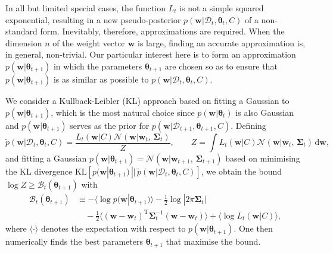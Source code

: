 In all but limited special cases, the function $L_t$ is not a simple squared exponential, resulting in a new pseudo-posterior $p(\mathbf{w}|\mathcal{D}_t, \boldsymbol{\theta}_t, C)$ of a non-standard form. Inevitably, therefore, approximations are required. When the dimension $n$ of the weight vector $\mathbf{w}$ is large, finding an accurate approximation is, in general, non-trivial. Our particular interest here is to form an approximation $p(\mathbf{w}|\boldsymbol{\theta}_{t+1})$ in which the parameters $\boldsymbol{\theta}_{t+1}$ are chosen so as to ensure that $p(\mathbf{w}|\boldsymbol{\theta}_{t+1})$ is as similar as possible to $p(\mathbf{w}|\mathcal{D}_t, \boldsymbol{\theta}_t, C)$.

We consider a Kullback-Leibler (KL) approach based on fitting a Gaussian to $p(\mathbf{w}|\boldsymbol{\theta}_{t+1})$, which is the most natural choice since $p(\mathbf{w}|\boldsymbol{\theta}_t)$ is also Gaussian and $p(\mathbf{w}|\boldsymbol{\theta}_{t+1})$ serves as the prior for $p(\mathbf{w}|\mathcal{D}_{t+1}, \boldsymbol{\theta}_{t+1}, C)$. Defining
\begin{equation}
	\widetilde{p}(\mathbf{w}|\mathcal{D}_t, \boldsymbol{\theta}_t, C)
	= \frac{L_t(\mathbf{w}|C)\mathcal{N}(\mathbf{w}|\mathbf{w}_t,\, \boldsymbol{\Sigma}_{t})}{Z},
	\qquad Z = \int L_t(\mathbf{w}|C)\mathcal{N}(\mathbf{w}|\mathbf{w}_t,\, \boldsymbol{\Sigma}_{t}) \, \mathrm{d}\mathbf{w},
\end{equation}
and fitting a Gaussian $p(\mathbf{w}|\boldsymbol{\theta}_{t+1}) = \mathcal{N}(\mathbf{w}|\mathbf{w}_{t+1},\, \boldsymbol{\Sigma}_{t+1})$ based on minimising the KL divergence $\mathrm{KL}[p(\mathbf{w}|\boldsymbol{\theta}_{t+1}) \, || \, \widetilde{p}(\mathbf{w}|\mathcal{D}_t, \boldsymbol{\theta}_t, C)]$, we obtain the bound $\log Z \geq \mathcal{B}_{t}(\boldsymbol{\theta}_{t+1})$ with
\begin{equation}
\begin{split}
	\mathcal{B}_{t}(\boldsymbol{\theta}_{t+1})
	& \equiv -\langle\log p(\mathbf{w}|\boldsymbol{\theta}_{t+1})\rangle - \frac{1}{2}\log|2\pi\boldsymbol{\Sigma}_{t}|
	\\
	& \quad -\frac{1}{2}\langle(\mathbf{w} - \mathbf{w}_t)^\text{T}\boldsymbol{\Sigma}_{t}^{-1}(\mathbf{w} - \mathbf{w}_t)\rangle + \langle\log L_t(\mathbf{w}|C)\rangle,
\end{split}
\end{equation}
where $\langle\cdot\rangle$ denotes the expectation with respect to $p(\mathbf{w}|\boldsymbol{\theta}_{t+1})$. One then numerically finds the best parameters $\boldsymbol{\theta}_{t+1}$ that maximise the bound.

